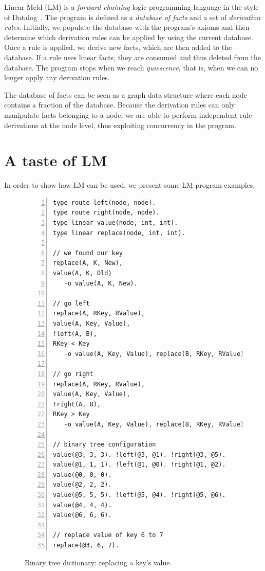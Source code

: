 
Linear Meld (LM) is a \emph{forward chaining} logic programming language in the style of Datalog~\cite{Ullman:1990:PDK:533142}. The program is defined as a \emph{database of facts} and a set of \emph{derivation rules}.
Initially, we populate the database with the program's axioms and then determine which derivation rules can be applied by using the current database. Once a rule is applied, we derive new facts, which are then added to the database.
If a rule uses linear facts, they are consumed and thus deleted from the database.
The program stops when we reach \emph{quiescence}, that is, when we can no longer
apply any derivation rules.

The database of facts can be seen as a graph data structure where each node contains a
fraction of the database.
Because the derivation rules can only manipulate facts belonging to
a node, we are able to perform independent rule derivations at the node level, thus
exploiting concurrency in the program.

\section{A taste of LM}

In order to show how LM can be used, we present some LM program examples.

\begin{figure}[h!]
\small\begin{Verbatim}[numbers=left]
type route left(node, node).
type route right(node, node).
type linear value(node, int, int).
type linear replace(node, int, int).

// we found our key
replace(A, K, New),
value(A, K, Old)
   -o value(A, K, New).

// go left
replace(A, RKey, RValue),
value(A, Key, Value),
!left(A, B),
RKey < Key
   -o value(A, Key, Value), replace(B, RKey, RValue).

// go right
replace(A, RKey, RValue),
value(A, Key, Value),
!right(A, B),
RKey > Key
   -o value(A, Key, Value), replace(B, RKey, RValue).

// binary tree configuration
value(@3, 3, 3). !left(@3, @1). !right(@3, @5).
value(@1, 1, 1). !left(@1, @0). !right(@1, @2).
value(@0, 0, 0).
value(@2, 2, 2).
value(@5, 5, 5). !left(@5, @4). !right(@5, @6).
value(@4, 4, 4).
value(@6, 6, 6).

// replace value of key 6 to 7
replace(@3, 6, 7).
\end{Verbatim}
\caption{Binary tree dictionary: replacing a key's value.}
  \label{code:btree_replace}
\end{figure}

